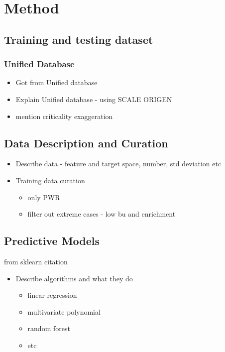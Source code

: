 \section{Method}

\subsection{Training and testing dataset}

\subsubsection{Unified Database}
\begin{itemize}
    \item Got from Unified database
    \item Explain Unified database - using SCALE ORIGEN
    \item mention criticality exaggeration
\end{itemize}

\subsection{Data Description and Curation}

\begin{itemize}
    \item Describe data - feature and target space, number, std deviation etc
    \item Training data curation
    \begin{itemize}
        \item only PWR
        \item filter out extreme cases - low bu and enrichment
    \end{itemize}
\end{itemize}

\subsection{Predictive Models}
from sklearn citation
\begin{itemize}
    \item   Describe algorithms and what they do
    \begin{itemize}
        \item linear regression
        \item multivariate polynomial
        \item random forest
        \item etc
    \end{itemize}
\end{itemize}


